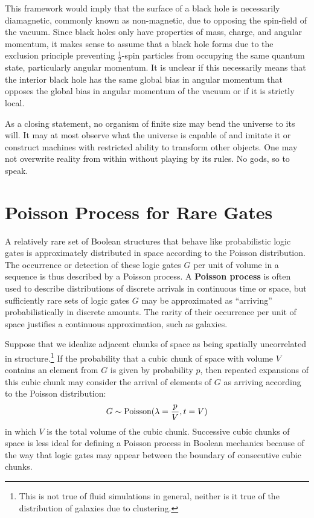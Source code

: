 \documentclass[10pt, a5paper, twoside, openright]{memoir}
\begin{document}
This framework would imply that the surface of a black hole is necessarily diamagnetic, commonly known as non-magnetic, due to opposing the spin-field of the vacuum. Since black holes only have properties of mass, charge, and angular momentum, it makes sense to assume that a black hole forms due to the exclusion principle preventing $\frac{1}{2}$-spin particles from occupying the same quantum state, particularly angular momentum. It is unclear if this necessarily means that the interior black hole has the same global bias in angular momentum that opposes the global bias in angular momentum of the vacuum or if it is strictly local.

As a closing statement, no organism of finite size may bend the universe to its will. It may at most observe what the universe is capable of and imitate it or construct machines with restricted ability to transform other objects. One may not overwrite reality from within without playing by its rules. No gods, so to speak.

\section{Poisson Process for Rare Gates}
A relatively rare set of Boolean structures that behave like probabilistic logic gates is approximately distributed in space according to the Poisson distribution. The occurrence or detection of these logic gates $G$ per unit of volume in a sequence is thus described by a Poisson process. A \textbf{Poisson process} is often used to describe distributions of discrete arrivals in continuous time or space, but sufficiently rare sets of logic gates $G$ may be approximated as ``arriving'' probabilistically in discrete amounts. The rarity of their occurrence per unit of space justifies a continuous approximation, such as galaxies.

Suppose that we idealize adjacent chunks of space as being spatially uncorrelated in structure.\footnote{This is not true of fluid simulations in general, neither is it true of the distribution of galaxies due to clustering.} If the probability that a cubic chunk of space with volume $V$ contains an element from $G$ is given by probability $p$, then repeated expansions of this cubic chunk may consider the arrival of elements of $G$ as arriving according to the Poisson distribution:
$$G \sim \textnormal{Poisson}(\lambda = \frac{p}{V}, t = V)$$
in which $V$ is the total volume of the cubic chunk. Successive cubic chunks of space is less ideal for defining a Poisson process in Boolean mechanics because of the way that logic gates may appear between the boundary of consecutive cubic chunks.
\end{document}

